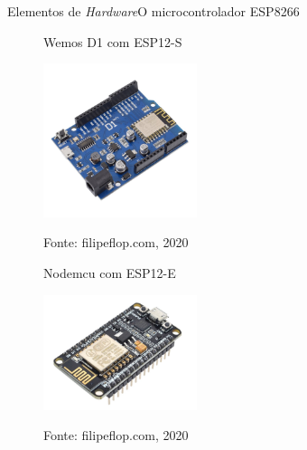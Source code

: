 \begin{frame}{Elementos de \textit{Hardware}}{O microcontrolador ESP8266}
    \vspace*{-0.4cm}
    \begin{figure}[!ht]
        \centering
        \hspace*{0.1cm}
        \begin{minipage}{0.5\linewidth}
            \centering
            \caption{Wemos D1 com ESP12-S}
            \includegraphics[width=0.4\textwidth]{figuras/ESP-12S-wemos.png}
            \label{fig:wemosesp12s}
            \caption*{\tiny{Fonte: filipeflop.com, 2020}}
        \end{minipage}\hfill
        \begin{minipage}{0.5\linewidth}
            \centering
            \caption{Nodemcu com ESP12-E}
            \hspace*{0.5cm}
            \includegraphics[width=0.4\textwidth]{figuras/ESP-12E-nodemcu.png}
            \label{fig:nodemcuesp12e}
            \vspace*{-0.5cm}
            \caption*{\tiny{Fonte: filipeflop.com, 2020}}
        \end{minipage}
    \end{figure}

\end{frame}

